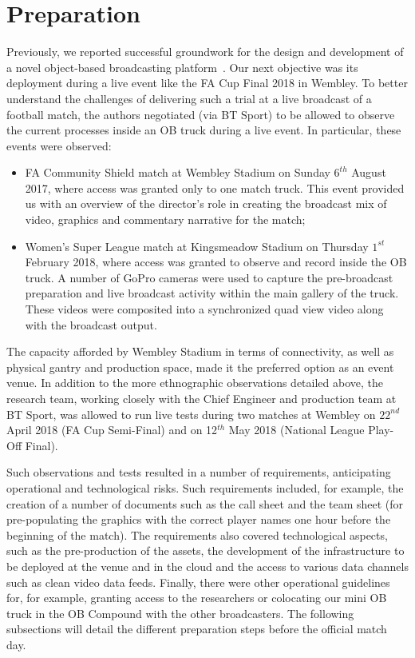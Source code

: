 \documentclass[sigchi-a]{acmart}
\begin{document}
\section{Preparation}

Previously, we reported successful groundwork for the design and development
of a novel object-based broadcasting platform~\cite{kegel2017, Li:2018_CHI, Li:2018_TVX}.
Our next objective was its deployment during a live event like the FA Cup Final
2018 in Wembley. To better understand the challenges of delivering such a trial at
a live broadcast of a football match, the authors negotiated (via BT Sport) to be allowed
to observe the current processes inside an OB truck during a live event. In
particular, these events were observed:

\begin{itemize}
  \item FA Community Shield match at Wembley Stadium on Sunday $6^{th}$ August 2017,
        where access was granted only to one match truck. This event provided us
        with an overview of the director's role in creating the broadcast mix of
        video, graphics and commentary narrative for the match;
  \item Women's Super League match at Kingsmeadow Stadium on Thursday $1^{st}$
        February 2018, where access was granted to observe and record inside the OB
        truck. A number of GoPro cameras were used to capture the pre-broadcast
        preparation and live broadcast activity within the main gallery of the
        truck. These videos were composited into a synchronized quad view video
        along with the broadcast output.
\end{itemize}

The capacity afforded by Wembley Stadium in terms of connectivity,
as well as physical gantry and production space, made it the preferred option as
an event venue. In addition to the more ethnographic observations detailed above,
the research team, working closely with the Chief Engineer and production team
at BT Sport, was allowed to run live tests during two matches at Wembley on $22^{nd}$
April 2018 (FA Cup Semi-Final) and on 12$^{th}$ May 2018 (National League Play-Off Final).

Such observations and tests resulted in a number of requirements, anticipating
operational and technological risks. Such requirements included, for example,
the creation of a number of documents such as the call sheet and the team sheet
(for pre-populating the graphics with the correct player names one hour before
the beginning of the match). The requirements also covered technological
aspects, such as the pre-production of the assets, the development of the
infrastructure to be deployed at the venue and in the cloud and the access to
various data channels such as clean video data feeds. Finally, there were
other operational guidelines for, for example, granting access to the researchers
or colocating our mini OB truck in the OB Compound with the other broadcasters.
The following subsections will detail the different preparation steps before the
official match day.
\end{document}
